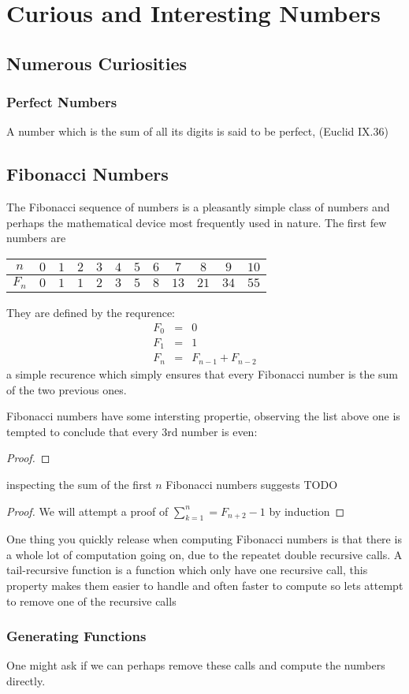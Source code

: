 \chapter{Curious and Interesting Numbers}
\section{Numerous Curiosities}
\subsection{Perfect Numbers} 
A number which is the sum of all its digits is said to be perfect, (Euclid IX.36)

\section{Fibonacci Numbers}
The Fibonacci sequence of numbers is a pleasantly simple class of numbers and perhaps the mathematical device most 
frequently used in nature. The first few numbers are
\begin{center}
\begin{tabular}{c|*{11}c}
$n$      & $0$ &  $1$   & $2$ &  $3$ & $4$ & $5$ & $6$ & $7$  & $8$    & $9$   & $10$ \\
\hline
$F_n$ & $0$ &  $1$   & $1$ &  $2$ & $3$ & $5$ & $8$ & $13$ & $21$ & $34$ & $55$ 
\end{tabular}
\end{center}

They are defined by the requrence:
\[\begin{array}{lcl} 
F_0 & = & 0 \\
F_1 & = & 1 \\
F_n & = & F_{n-1} + F_{n-2}
\end{array}\]
a simple recurence which simply ensures that every Fibonacci number is the sum of the two previous ones.

Fibonacci numbers have some intersting propertie, observing the list above one is tempted to conclude that every 3rd
number is even:
\begin{proof}

\end{proof}

inspecting the sum of the first $n$ Fibonacci numbers suggests TODO
\begin{proof}
We will attempt a proof of $\sum_{k=1}^{n} = F_{n+2} - 1$ by induction
\end{proof}

\myindent One thing you quickly release when computing Fibonacci numbers is that there is a whole lot of computation going on, due
to the repeatet double recursive calls. A tail-recursive function is a function which only have one recursive call, this
property makes them easier to handle and often faster to compute so lets attempt to remove one of the recursive calls


\subsection{Generating Functions}
One might ask if we can perhaps remove these calls and compute the numbers directly. 
